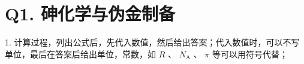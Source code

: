 \section*{Q1. 砷化学与伪金制备}
1. 计算过程，列出公式后，先代入数值，然后给出答案；代入数值时，可以不写单位，最后在答案后给出单位，常数，如 $R$ 、 $N_{\mathrm{A}}$ 、 $\pi$ 等可以用符号代替；

